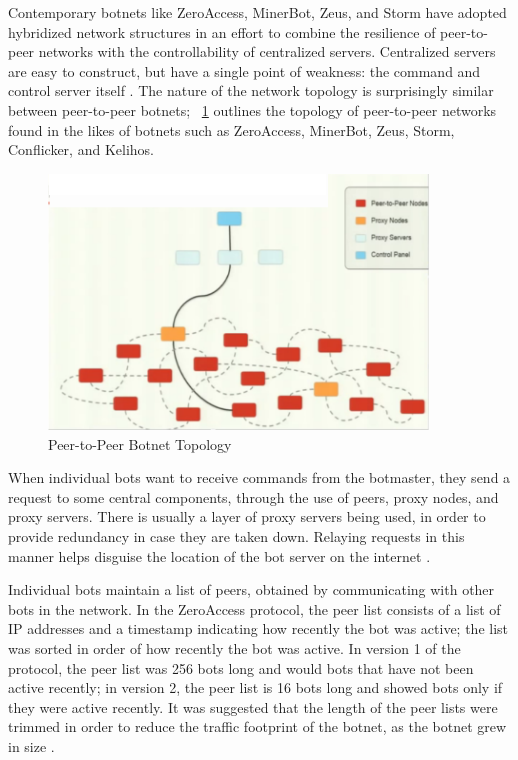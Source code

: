 \documentclass{acm_proc_article-sp}
\begin{document}
Contemporary botnets like ZeroAccess, MinerBot, Zeus, and Storm have adopted hybridized network structures in an effort to combine the resilience of peer-to-peer networks with the controllability of centralized servers.  Centralized servers are easy to construct, but have a single point of weakness: the command and control server itself \cite{wang:p2p}.  The nature of the network topology is surprisingly similar between peer-to-peer botnets;  ~\ref{fig:p2p-architecture} outlines the topology of peer-to-peer networks found in the likes of botnets such as ZeroAccess, MinerBot, Zeus, Storm, Conflicker, and Kelihos.

\begin{figure}[here]
\includegraphics[width=0.9\textwidth]{p2p-architecture.png}
\caption{Peer-to-Peer Botnet Topology}
\label{fig:p2p-architecture}
\end{figure}


When individual bots want to receive commands from the botmaster, they send a request to some central components, through the use of peers, proxy nodes, and proxy servers. There is usually a layer of proxy servers being used, in order to provide redundancy in case they are taken down. Relaying requests in this manner helps disguise the location of the bot server on the internet \cite{defcon:prowling}.

Individual bots maintain a list of peers, obtained by communicating with other bots in the network.  In the ZeroAccess protocol, the peer list consists of a list of IP addresses and a timestamp indicating how recently the bot was active; the list was sorted in order of how recently the bot was active. In version 1 of the protocol, the peer list was 256 bots long and would bots that have not been active recently; in version 2, the peer list is 16 bots long and showed bots only if they were active recently.  It was suggested that the length of the peer lists were trimmed in order to reduce the traffic footprint of the botnet, as the botnet grew in size  \cite{defcon:prowling}.  
\end{document}
